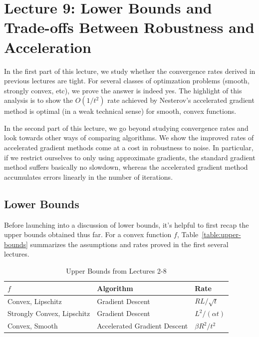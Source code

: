 \section{Lecture 9: Lower Bounds and Trade-offs Between Robustness and Acceleration}

In the first part of this lecture, we study whether the convergence rates
derived in previous lectures are tight. For several classes of optimzation
problems (smooth, strongly convex, etc), we prove the
answer is indeed yes. The highlight of this analysis is to show the $O(1/t^2)$
rate achieved by Nesterov's accelerated gradient method is optimal (in a weak
technical sense) for smooth, convex functions. 

In the second part of this lecture, we go beyond studying convergence rates and
look towards other ways of comparing algorithms. We show the improved rates of
accelerated gradient methods come at a cost in robustness to noise. In
particular, if we restrict ourselves to only using approximate gradients, the
standard gradient method suffers basically no slowdown, whereas the accelerated
gradient method accumulates errors linearly in the number of iterations.

\subsection{Lower Bounds}
Before launching into a discussion of lower bounds, it's helpful to first recap
the upper bounds obtained thus far. For a convex function $f$,
Table~\eqref{table:upper-bounds} summarizes the assumptions and rates proved in
the first several lectures. 
~
\begin{table}[]
\centering
\caption{Upper Bounds from Lectures 2-8}
\label{table:upper-bounds}
\begin{tabular}{|l|l|l|}
\hline
$f$                        & Algorithm                    & Rate                                            \\ \hline
Convex, Lipschitz          & Gradient Descent             & $RL / \sqrt{t}$                               \\ \hline
Strongly Convex, Lipschitz & Gradient Descent             & $L^2 / (\alpha t)$                \\ \hline
Convex, Smooth             & Accelerated Gradient Descent & $\beta R^2 / t^2$ \\ \hline
\end{tabular}
\end{table}  

